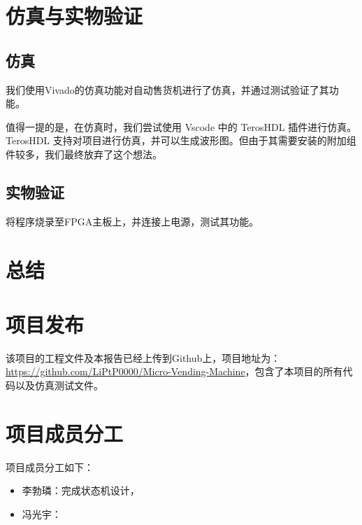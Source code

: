 \documentclass[12pt]{SEU-Circuit-Report}
\renewcommand\appendix{\par
    \setcounter{section}{0}
    \setcounter{subsection}{0}
    \gdef\thesection{附录 \Alph{section}}}
\begin{document}
    \section{仿真与实物验证}
    \subsection{仿真}
    我们使用Vivado的仿真功能对自动售货机进行了仿真，并通过测试验证了其功能。

    值得一提的是，在仿真时，我们尝试使用 Vscode 中的 TerosHDL 插件进行仿真。TerosHDL 支持对项目进行仿真，并可以生成波形图。但由于其需要安装的附加组件较多，我们最终放弃了这个想法。
    \subsection{实物验证}
    将程序烧录至FPGA主板上，并连接上电源，测试其功能。
    \section{总结}
    \newpage
    \appendix
    
    \section{项目发布}
    该项目的工程文件及本报告已经上传到Github上，项目地址为：\url{https://github.com/LiPtP0000/Micro-Vending-Machine}，包含了本项目的所有代码以及仿真测试文件。
    \section{项目成员分工}
    项目成员分工如下：
    \begin{itemize}
        \item 李勃璘：完成状态机设计，
        \item 冯光宇：
    \end{itemize}
\end{document}

